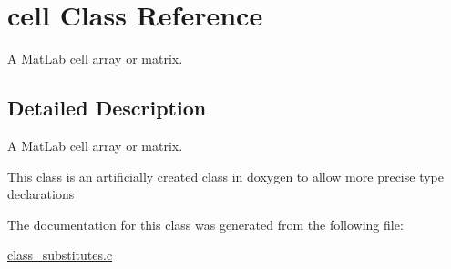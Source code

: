 \hypertarget{a00002}{\section{cell Class Reference}
\label{a00002}
}


A Mat\-Lab cell array or matrix.  




\subsection{Detailed Description}
A Mat\-Lab cell array or matrix. 

This class is an artificially created class in doxygen to allow more precise type declarations 

The documentation for this class was generated from the following file\-:\begin{DoxyCompactItemize}
\item 
\hyperlink{a00016}{class\-\_\-substitutes.\-c}\end{DoxyCompactItemize}
